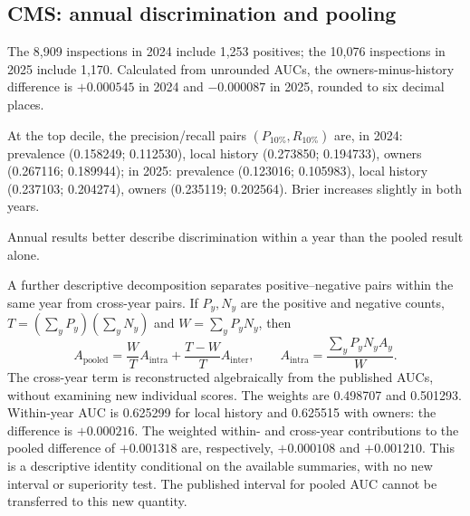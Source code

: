 \subsection{CMS: annual discrimination and pooling}
\label{sec:cmsannual}

\begin{table}[!htbp]
\centering\footnotesize
\caption{CMS: test results by year, transcribed from the frozen analysis. Prevalence is 14.0644\,\% in 2024 and 11.6118\,\% in 2025. AP uses the code's rank convention. The supplement includes 2023 validation\cite{hgbanalysis}.}
\label{tab:cmsannual}

\end{table}

The 8,909 inspections in 2024 include 1,253 positives; the 10,076 inspections in 2025 include 1,170. Calculated from unrounded AUCs, the owners-minus-history difference is $+0.000545$ in 2024 and $-0.000087$ in 2025, rounded to six decimal places.

At the top decile, the precision/recall pairs $(P_{10\%},R_{10\%})$ are, in 2024: prevalence (0.158249; 0.112530), local history (0.273850; 0.194733), owners (0.267116; 0.189944); in 2025: prevalence (0.123016; 0.105983), local history (0.237103; 0.204274), owners (0.235119; 0.202564). Brier increases slightly in both years.

Annual results better describe discrimination within a year than the pooled result alone.

A further descriptive decomposition separates positive--negative pairs within the same year from cross-year pairs. If $P_y,N_y$ are the positive and negative counts, $T=(\sum_yP_y)(\sum_yN_y)$ and $W=\sum_yP_yN_y$, then
\begin{equation}
 A_{\text{pooled}}=\frac{W}{T} A_{\mathrm{intra}}+
 \frac{T-W}{T} A_{\mathrm{inter}},\qquad
 A_{\mathrm{intra}}=\frac{\sum_y P_yN_y A_y}{W}.
\label{eq:decomp}
\end{equation}
The cross-year term is reconstructed algebraically from the published AUCs, without examining new individual scores. The weights are 0.498707 and 0.501293. Within-year AUC is 0.625299 for local history and 0.625515 with owners: the difference is $+0.000216$. The weighted within- and cross-year contributions to the pooled difference of $+0.001318$ are, respectively, $+0.000108$ and $+0.001210$. This is a descriptive identity conditional on the available summaries, with no new interval or superiority test. The published interval for pooled AUC cannot be transferred to this new quantity.

